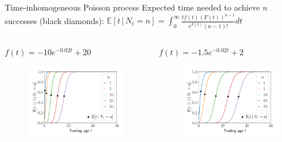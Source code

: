 \documentclass{beamer}
\begin{document}
\begin{frame}[allowframebreaks]{Time-inhomogeneous Poisson process}
Expected time needed to achieve $n$ successes (black diamonds):
$
\mathbb{E}[t \,|\, N_t = n] = \int_0^{\infty} \frac{tf(t)(F(t))^{n-1}}{e^{F(t)}(n - 1)!} dt
$
	\begin{columns}[t]
		\begin{column}{0.49\textwidth}
			\begin{block}{$f(t)=-10e^{-0.02t}+20$}
				\begin{figure}
					\includegraphics[width=\linewidth]{figures/cdft2}
				\end{figure}
			\end{block}
		\end{column}

		\begin{column}{0.49\textwidth}
			\begin{block}{$f(t)=-1.5e^{-0.02t}+2$}
				\begin{figure}
					\includegraphics[width=\linewidth]{figures/cdft1}
				\end{figure}
			\end{block}
		\end{column}
	\end{columns}



\end{frame}
\end{document}
